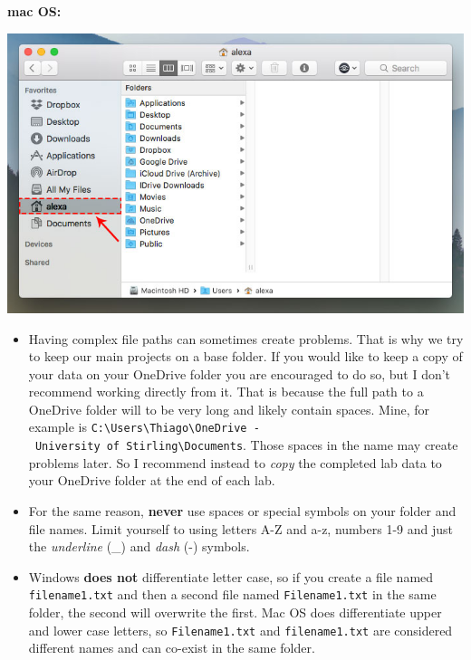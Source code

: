 \documentclass[
  letterpaper,
  DIV=11,
  numbers=noendperiod]{scrreprt}
\begin{document}
\textbf{mac OS:}

\includegraphics{images/lab_1/lab1_fig3_macfolder.png}

\begin{tcolorbox}[enhanced jigsaw, coltitle=black, toprule=.15mm, breakable, opacitybacktitle=0.6, left=2mm, colback=white, leftrule=.75mm, rightrule=.15mm, colbacktitle=quarto-callout-warning-color!10!white, toptitle=1mm, titlerule=0mm, colframe=quarto-callout-warning-color-frame, arc=.35mm, bottomtitle=1mm, opacityback=0, bottomrule=.15mm, title=\textcolor{quarto-callout-warning-color}{\faExclamationTriangle}\hspace{0.5em}{Warning}]

\begin{itemize}
\item
  Having complex file paths can sometimes create problems. That is why
  we try to keep our main projects on a base folder. If you would like
  to keep a copy of your data on your OneDrive folder you are encouraged
  to do so, but I don't recommend working directly from it. That is
  because the full path to a OneDrive folder will to be very long and
  likely contain spaces. Mine, for example is
  \texttt{C:\textbackslash{}Users\textbackslash{}Thiago\textbackslash{}OneDrive\ -\ University\ of\ Stirling\textbackslash{}Documents}.
  Those spaces in the name may create problems later. So I recommend
  instead to \emph{copy} the completed lab data to your OneDrive folder
  at the end of each lab.
\item
  For the same reason, \textbf{never} use spaces or special symbols on
  your folder and file names. Limit yourself to using letters A-Z and
  a-z, numbers 1-9 and just the \emph{underline} (\_) and \emph{dash}
  (-) symbols.
\item
  Windows \textbf{does not} differentiate letter case, so if you create
  a file named \texttt{filename1.txt} and then a second file named
  \texttt{Filename1.txt} in the same folder, the second will overwrite
  the first. Mac OS does differentiate upper and lower case letters, so
  \texttt{Filename1.txt} and \texttt{filename1.txt} are considered
  different names and can co-exist in the same folder.
\end{itemize}

\end{tcolorbox}
\end{document}
